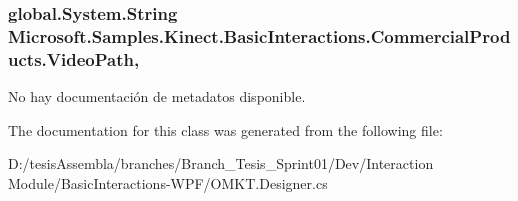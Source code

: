 \hypertarget{class_microsoft_1_1_samples_1_1_kinect_1_1_basic_interactions_1_1_commercial_products_a0b97b85ce0c4abfff271af4a81e22874}{
\subsubsection[{Video\-Path}]{\setlength{\rightskip}{0pt plus 5cm}global.\-System.\-String Microsoft.\-Samples.\-Kinect.\-Basic\-Interactions.\-Commercial\-Products.\-Video\-Path\hspace{0.3cm}{\ttfamily [get]}, {\ttfamily [set]}}}\label{class_microsoft_1_1_samples_1_1_kinect_1_1_basic_interactions_1_1_commercial_products_a0b97b85ce0c4abfff271af4a81e22874}


No hay documentación de metadatos disponible. 



The documentation for this class was generated from the following file\-:\begin{DoxyCompactItemize}
\item 
D\-:/tesis\-Assembla/branches/\-Branch\-\_\-\-Tesis\-\_\-\-Sprint01/\-Dev/\-Interaction Module/\-Basic\-Interactions-\/\-W\-P\-F/O\-M\-K\-T.\-Designer.\-cs\end{DoxyCompactItemize}
